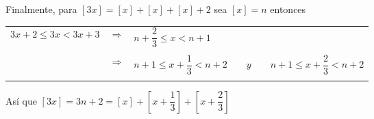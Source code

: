 \begin{enumerate}[ \bfseries 1.]
\begin{enumerate}[\bfseries (a)]
		Finalmente, para $[3x]=[x]+[x]+[x]+2$ sea $[x]=n$ entonces
		\begin{center}
		    \begin{tabular}{rcl}
			$3x+2\leq 3x < 3x+3$&$\Longrightarrow$&$n+\dfrac{2}{3} \leq x < n+1$\\\\
			&$\Longrightarrow$&$n+1 \leq x +\dfrac{1}{3}<n+2 \qquad y \qquad n+1\leq x+\dfrac{2}{3}<n+2$\\\\
		    \end{tabular}
		\end{center}
		Así que $[3x]=3n+2=[x]+\left[x+\dfrac{1}{3}\right]+\left[x+\dfrac{2}{3}\right]$\\\\

	\end{enumerate}


\end{enumerate}
